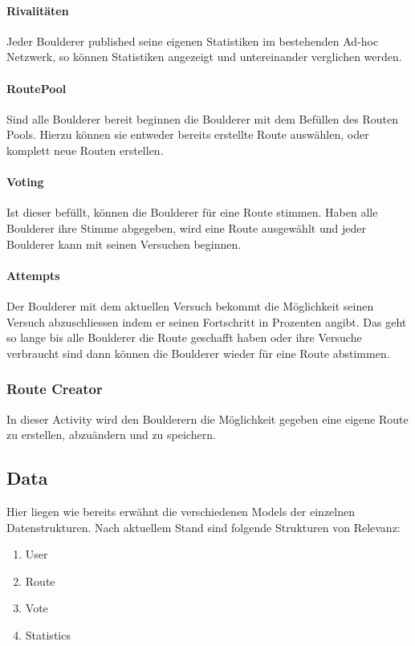 \documentclass[11pt,a4paper,headsepline,footsepline,bibliography=totocnumbered]{article}
\newcommand{\subsubsubsection}[1]{\paragraph{#1}\mbox{}}
\begin{document}
      \subsubsubsection{Rivalitäten}
        \par
          Jeder Boulderer published seine eigenen Statistiken im bestehenden Ad-hoc Netzwerk, so können Statistiken angezeigt und untereinander verglichen werden.

      \subsubsubsection{RoutePool}
        \par
          Sind alle Boulderer bereit beginnen die Boulderer mit dem Befüllen des Routen Pools.
          Hierzu können sie entweder bereits erstellte Route auswählen, oder komplett neue Routen erstellen.

      \subsubsubsection{Voting}
        \par
          Ist dieser befüllt, können die Boulderer für eine Route stimmen.
          Haben alle Boulderer ihre Stimme abgegeben, wird eine Route ausgewählt und jeder Boulderer kann mit seinen Versuchen beginnen.

      \subsubsubsection{Attempts}
        \par
          Der Boulderer mit dem aktuellen Versuch bekommt die Möglichkeit seinen Versuch abzuschliessen indem er seinen Fortschritt in Prozenten angibt.
          Das geht so lange bis alle Boulderer die Route geschafft haben oder ihre Versuche verbraucht sind dann können die Boulderer wieder für eine Route abstimmen.

    \subsubsection{Route Creator}
      \par
        In dieser Activity wird den Boulderern die Möglichkeit gegeben eine eigene Route zu erstellen, abzuändern und zu speichern.


  \subsection{Data}
    \par
      Hier liegen wie bereits erwähnt die verschiedenen Models der einzelnen Datenstrukturen.
      Nach aktuellem Stand sind folgende Strukturen von Relevanz:
      \begin{enumerate}
        \item User
        \item Route
        \item Vote
        \item Statistics
      \end{enumerate}
\end{document}
